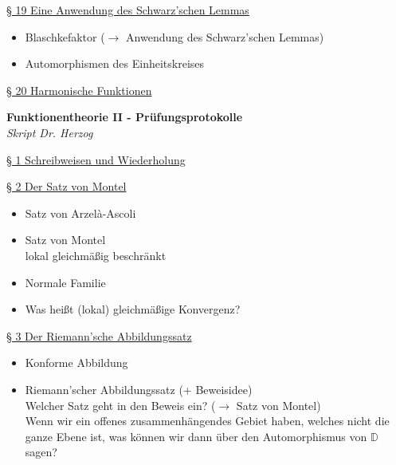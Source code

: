 \documentclass[11pt]{article}
\newcommand{\D}{\mathbb{D}}
\begin{document}
\underline{§ 19 Eine Anwendung des Schwarz'schen Lemmas}
\vspace{-0.5cm}
\begin{itemize}
\item Blaschkefaktor ($\rightarrow$ Anwendung des Schwarz'schen Lemmas)
\item Automorphismen des Einheitskreises 
\end{itemize}

\underline{§ 20 Harmonische Funktionen}

\newpage

\begin{center}
{\Large \textbf{Funktionentheorie II - Prüfungsprotokolle}} \\
\textit{Skript Dr. Herzog}
\end{center}

\underline{§ 1 Schreibweisen und Wiederholung}

\underline{§ 2 Der Satz von Montel}
\vspace{-0.5cm}
\begin{itemize}
\item Satz von Arzelà-Ascoli
\item Satz von Montel \\
\quad lokal gleichmäßig beschränkt
\item Normale Familie
\item Was heißt (lokal) gleichmäßige Konvergenz?
\end{itemize}

\underline{§ 3 Der Riemann'sche Abbildungssatz}
\vspace{-0.5cm}
\begin{itemize}
\item Konforme Abbildung
\item Riemann'scher Abbildungssatz (+ Beweisidee) \\
\quad Welcher Satz geht in den Beweis ein? ($\rightarrow$ Satz von Montel)\\
\quad Wenn wir ein offenes zusammenhängendes Gebiet haben, welches nicht die ganze Ebene ist, was können wir dann über den Automorphismus von $\D$ sagen?
\end{itemize}
\end{document}
